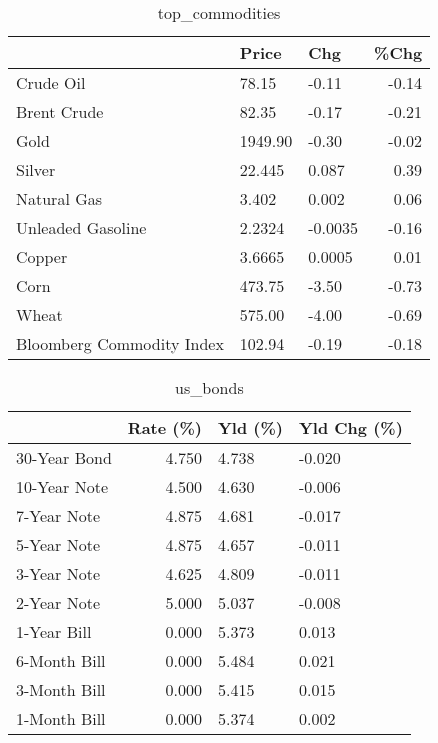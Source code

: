 \documentclass{article}%
\begin{document}
\begin{table}[htbp]%
\caption{top\_commodities}%
\centering%
\begin{adjustbox}{width=1\textwidth}%
\begin{tabular}{lllr}
\toprule
                          &   Price &     Chg &  \%Chg \\
\midrule
               Crude Oil  &   78.15 &   -0.11 & -0.14 \\
             Brent Crude  &   82.35 &   -0.17 & -0.21 \\
                    Gold  & 1949.90 &   -0.30 & -0.02 \\
                  Silver  &  22.445 &   0.087 &  0.39 \\
             Natural Gas  &   3.402 &   0.002 &  0.06 \\
       Unleaded Gasoline  &  2.2324 & -0.0035 & -0.16 \\
                  Copper  &  3.6665 &  0.0005 &  0.01 \\
                    Corn  &  473.75 &   -3.50 & -0.73 \\
                   Wheat  &  575.00 &   -4.00 & -0.69 \\
Bloomberg Commodity Index &  102.94 &   -0.19 & -0.18 \\
\bottomrule
\end{tabular}
%
\end{adjustbox}%
\end{table}

%


\begin{table}[htbp]%
\caption{us\_bonds}%
\centering%
\begin{adjustbox}{width=1\textwidth}%
\begin{tabular}{lrll}
\toprule
             &  Rate (\%) & Yld (\%) & Yld Chg (\%) \\
\midrule
30-Year Bond &     4.750 &   4.738 &      -0.020 \\
10-Year Note &     4.500 &   4.630 &      -0.006 \\
 7-Year Note &     4.875 &   4.681 &      -0.017 \\
 5-Year Note &     4.875 &   4.657 &      -0.011 \\
 3-Year Note &     4.625 &   4.809 &      -0.011 \\
 2-Year Note &     5.000 &   5.037 &      -0.008 \\
 1-Year Bill &     0.000 &   5.373 &       0.013 \\
6-Month Bill &     0.000 &   5.484 &       0.021 \\
3-Month Bill &     0.000 &   5.415 &       0.015 \\
1-Month Bill &     0.000 &   5.374 &       0.002 \\
\bottomrule
\end{tabular}
%
\end{adjustbox}%
\end{table}
\end{document}
